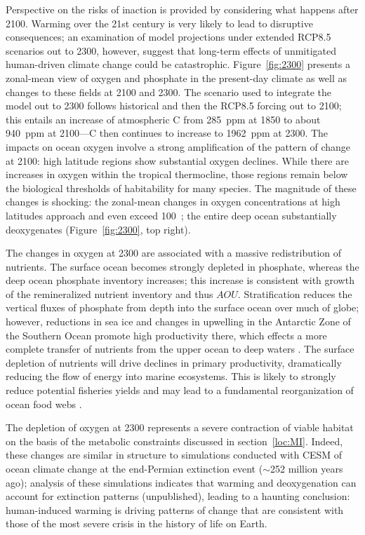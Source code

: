 \documentclass{report_chapter}
\begin{document}
Perspective on the risks of inaction is provided by considering what happens after 2100.
Warming over the 21st century is very likely to lead to disruptive consequences; an examination of model projections under extended RCP8.5 scenarios out to 2300, however, suggest that long-term effects of unmitigated human-driven climate change could be catastrophic.
Figure~\ref{fig:2300} presents a zonal-mean view of oxygen and phosphate in the present-day climate as well as changes to these fields at 2100 and 2300.
The scenario used to integrate the model out to 2300 follows historical and then the RCP8.5 forcing out to 2100; this entails an increase of atmospheric C\OO{} from 285~ppm at 1850 to about 940~ppm at 2100---C\OO{} then continues to increase to 1962~ppm at 2300.
The impacts on ocean oxygen involve a strong amplification of the pattern of change at 2100: high latitude regions show substantial oxygen declines.  While there are increases in oxygen within the tropical thermocline, those regions remain below the biological thresholds of habitability for many species.
The magnitude of these changes is shocking: the zonal-mean changes in oxygen concentrations at high latitudes approach and even exceed 100~\mmolmmm{}; the entire deep ocean substantially deoxygenates (Figure~\ref{fig:2300}, top right).

The changes in oxygen at 2300 are associated with a massive redistribution of nutrients.
The surface ocean becomes strongly depleted in phosphate, whereas the deep ocean phosphate inventory increases; this increase is consistent with growth of the remineralized nutrient inventory and thus $AOU$.
Stratification reduces the vertical fluxes of phosphate from depth into the surface ocean over much of globe; however, reductions in sea ice and changes in upwelling in the Antarctic Zone of the Southern Ocean promote high productivity there, which effects a more complete transfer of nutrients from the upper ocean to deep waters \citep{Primeau-Holzer-etal-2013}.
The surface depletion of nutrients will drive declines in primary productivity, dramatically reducing the flow of energy into marine ecosystems.
This is likely to strongly reduce potential fisheries yields \citep{Stock-John-etal-2017,Pauly-Christensen-1995} and may lead to a fundamental reorganization of ocean food webs \citep{Hoegh-Guldberg-Bruno-2010}.

The depletion of oxygen at 2300 represents a severe contraction of viable habitat on the basis of the metabolic constraints discussed in section~\ref{loc:MI}.
Indeed, these changes are similar in structure to simulations conducted with CESM of ocean climate change at the end-Permian extinction event ($\sim$252 million years ago); analysis of these simulations indicates that warming and deoxygenation can account for extinction patterns (unpublished), leading to a haunting conclusion: human-induced warming is driving patterns of change that are consistent with those of the most severe crisis in the history of life on Earth.
\end{document}
